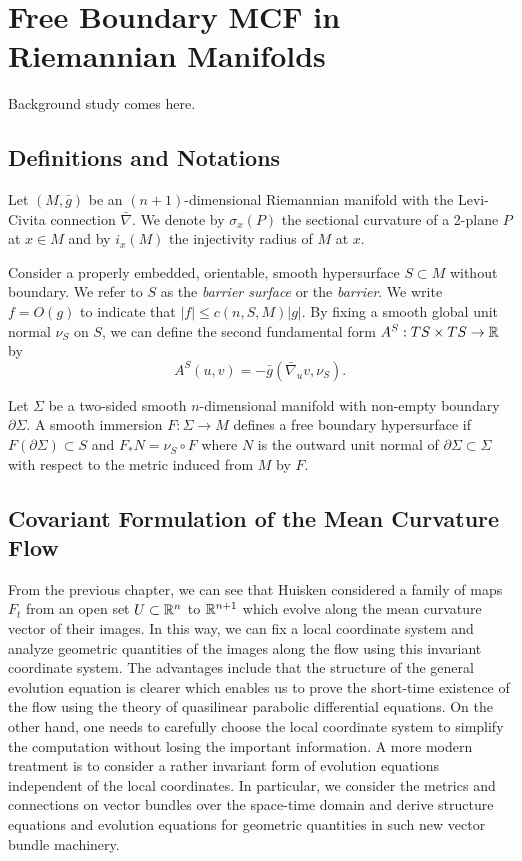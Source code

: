%

\chapter{Free Boundary MCF in Riemannian Manifolds}



{
Background study comes here.
}

\section{Definitions and Notations}

Let $(M, \bar{g})$ be an $(n+1)$-dimensional Riemannian manifold with the Levi-Civita connection $\bar{\nabla }$. We denote by $\sigma _x(P)$ the sectional curvature of a 2-plane $P$ at $x \in M$ and by $i_x(M)$ the injectivity radius of $M$ at $x$. 

Consider a properly embedded, orientable, smooth hypersurface $S \subset M$ without boundary. We refer to $S$ as the \textit{barrier surface} or the \textit{barrier}. We write $f=O(g)$ to indicate that $\left| f \right| \leq c(n,S,M)\left| g \right| $. By fixing a smooth global unit normal $\nu _S$ on $S$, we can define the second fundamental form $A^S: TS \times TS \to \mathbb{R}$ by
\[A^S(u,v)=-\bar{g}(\bar{\nabla }_u v, \nu _S).\]

Let $\Sigma $ be a two-sided smooth $n$-dimensional manifold with non-empty boundary $\partial \Sigma $. A smooth immersion $F : \Sigma \to  M$ defines a free boundary hypersurface if $F(\partial \Sigma ) \subset S$ and $F_* N = \nu _S \circ F$ where $N$ is the outward unit normal of $\partial \Sigma \subset \Sigma $ with respect to the metric induced from $M$ by $F$.




\section{Covariant Formulation of the Mean Curvature Flow}

From the previous chapter, we can see that Huisken considered a family of maps $F_t$ from an open set $U \subset \mathbb{R}^n$ to $\mathbb{R}^{n+1}$ which evolve along the mean curvature vector of their images. In this way, we can fix a local coordinate system and analyze geometric quantities of the images along the flow using this invariant coordinate system. The advantages include that the structure of the general evolution equation is clearer which enables us to prove the short-time existence of the flow using the theory of quasilinear parabolic differential equations. On the other hand, one needs to carefully choose the local coordinate system to simplify the computation without losing the important information. A more modern treatment is to consider a rather invariant form of evolution equations independent of the local coordinates. In particular, we consider the metrics and connections on vector bundles over the space-time domain and derive structure equations and evolution equations for geometric quantities in such new vector bundle machinery.


